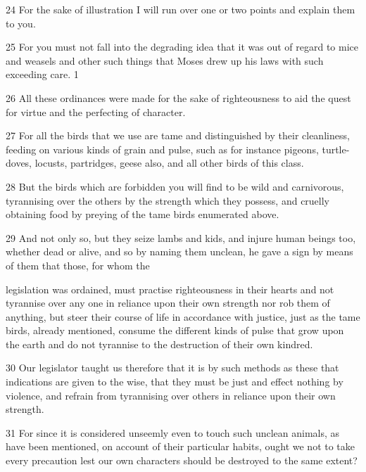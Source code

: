 \par 24 For the sake of illustration I will run over one or two points and explain them to you.

\par 25 For you must not fall into the degrading idea that it was out of regard to mice and weasels and other such things that Moses drew up his laws with such exceeding care. 1

\par 26 All these ordinances were made for the sake of righteousness to aid the quest for virtue and the perfecting of character.

\par 27 For all the birds that we use are tame and distinguished by their cleanliness, feeding on various kinds of grain and pulse, such as for instance pigeons, turtle-doves, locusts, partridges, geese also, and all other birds of this class.

\par 28 But the birds which are forbidden you will find to be wild and carnivorous, tyrannising over the others by the strength which they possess, and cruelly obtaining food by preying of the tame birds enumerated above.

\par 29 And not only so, but they seize lambs and kids, and injure human beings too, whether dead or alive, and so by naming them unclean, he gave a sign by means of them that those, for whom the

legislation was ordained, must practise righteousness in their hearts and not tyrannise over any one in reliance upon their own strength nor rob them of anything, but steer their course of life in accordance with justice, just as the tame birds, already mentioned, consume the different kinds of pulse that grow upon the earth and do not tyrannise to the destruction of their own kindred.

\par 30 Our legislator taught us therefore that it is by such methods as these that indications are given to the wise, that they must be just and effect nothing by violence, and refrain from tyrannising over others in reliance upon their own strength.

\par 31 For since it is considered unseemly even to touch such unclean animals, as have been mentioned, on account of their particular habits, ought we not to take every precaution lest our own characters should be destroyed to the same extent?

